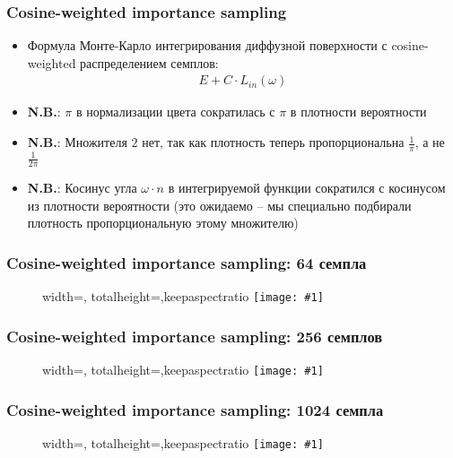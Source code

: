 \documentclass[10pt]{beamer}
\newcommand{\slideimage}[1]{
  \begin{figure}
    \begin{adjustbox}{width=\textwidth, totalheight=\textheight-2\baselineskip-2\baselineskip,keepaspectratio}
      \texttt{[image: \#1]}
    \end{adjustbox}
  \end{figure}
}
\begin{document}
\begin{frame}
\frametitle{Cosine-weighted importance sampling}
\begin{itemize}
\item Формула Монте-Карло интегрирования диффузной поверхности с cosine-weighted распределением семплов:
\begin{gather*}
E + C \cdot L_{in}(\omega)
\end{gather*}
\pause
\item \alert{\textbf{N.B.}}: \begin{math}\pi\end{math} в нормализации цвета сократилась с \begin{math}\pi\end{math} в плотности вероятности
\pause
\item \alert{\textbf{N.B.}}: Множителя \begin{math}2\end{math} нет, так как плотность теперь пропорциональна \begin{math}\frac{1}{\pi}\end{math}, а не \begin{math}\frac{1}{2\pi}\end{math}
\pause
\item \alert{\textbf{N.B.}}: Косинус угла \begin{math}\omega \cdot n\end{math} в интегрируемой функции сократился с косинусом из плотности вероятности (это ожидаемо -- мы специально подбирали плотность пропорциональную этому множителю)
\end{itemize}
\end{frame}

\begin{frame}
\frametitle{Cosine-weighted importance sampling: 64 семпла}
\slideimage{cosine_64.png}
\end{frame}

\begin{frame}
\frametitle{Cosine-weighted importance sampling: 256 семплов}
\slideimage{cosine_256.png}
\end{frame}

\begin{frame}
\frametitle{Cosine-weighted importance sampling: 1024 семпла}
\slideimage{cosine_1024.png}
\end{frame}
\end{document}
